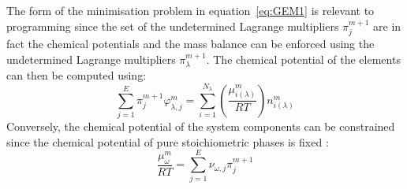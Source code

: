 	The  form of the minimisation problem in equation~\eqref{eq:GEM1} is relevant to programming since the set of the undetermined Lagrange multipliers $\pi_{j}^{m+1}$ are in fact the chemical potentials and the mass balance can be enforced using the undetermined Lagrange multipliers $\pi_{\lambda}^{m+1}$. The chemical potential of the elements can then be computed using:
	\begin{equation}\label{eq:GEM2}
		\sum_{j=1}^{E} \pi_{j}^{m+1} \varphi_{\lambda,j}^{m} = \sum_{i=1}^{N_\lambda} \left(\frac{\mu_{i(\lambda)}^{m}}{RT}\right)n_{i(\lambda)}^{m}
	\end{equation}
	 Conversely, the chemical potential of the system components can be constrained since the chemical potential of pure stoichiometric phases is fixed \cite{Piro11b}:
	 \begin{equation}\label{eq:GEM3}
		\frac{\mu_{\omega}^{m}}{RT} = \sum_{j=1}^{E} \nu_{\omega,j} \pi_{j}^{m+1}
	\end{equation}

